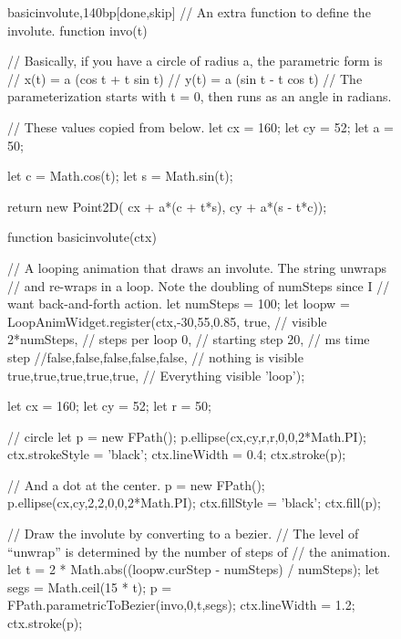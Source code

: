 \documentclass[10pt]{article}
\begin{document}
\begin{figure}[b!]
\begin{figput}{basicinvolute,140bp}[done,skip]
// An extra function to define the involute.
function invo(t) {
  
  // Basically, if you have a circle of radius a, the parametric form is
  // x(t) = a (cos t + t sin t)
  // y(t) = a (sin t - t cos t)
  // The parameterization starts with t = 0, then runs as an angle in radians.

  // These values copied from below.
  let cx = 160;
  let cy = 52;
  let a = 50;

  let c = Math.cos(t);
  let s = Math.sin(t);

  return new Point2D( cx + a*(c + t*s), cy + a*(s - t*c));  
}

function basicinvolute(ctx) {

  // A looping animation that draws an involute. The string unwraps
  // and re-wraps in a loop. Note the doubling of numSteps since I
  // want back-and-forth action.
  let numSteps = 100;
  let loopw = LoopAnimWidget.register(ctx,-30,55,0.85,
  true, // visible
  2*numSteps, // steps per loop
  0, // starting step
  20, // ms time step
  //false,false,false,false,false, // nothing is visible
  true,true,true,true,true, // Everything visible
  'loop');

  let cx = 160;
  let cy = 52;
  let r = 50;

  // circle
  let p = new FPath();
  p.ellipse(cx,cy,r,r,0,0,2*Math.PI);
  ctx.strokeStyle = 'black';
  ctx.lineWidth = 0.4;
  ctx.stroke(p);

  // And a dot at the center.
  p = new FPath();
  p.ellipse(cx,cy,2,2,0,0,2*Math.PI);
  ctx.fillStyle = 'black';
  ctx.fill(p);

  // Draw the involute by converting to a bezier.
  // The level of ``unwrap'' is determined by the number of steps of
  // the animation.
  let t = 2 * Math.abs((loopw.curStep - numSteps) / numSteps);  
  let segs = Math.ceil(15 * t);
  p = FPath.parametricToBezier(invo,0,t,segs);
  ctx.lineWidth = 1.2;
  ctx.stroke(p);

}
\end{figput}
\end{figure}
\end{document}
